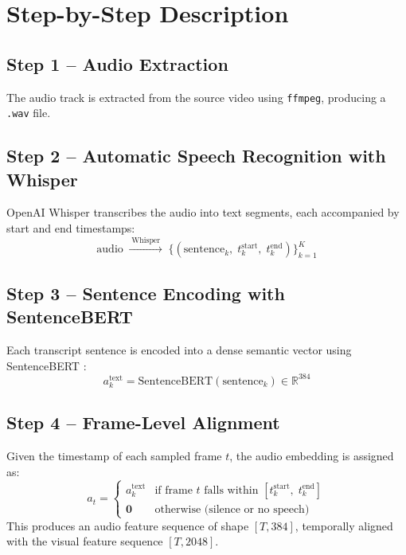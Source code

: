 \documentclass[12pt, a4paper]{report}
\begin{document}
\section{Step-by-Step Description}

\subsection{Step 1 -- Audio Extraction}
The audio track is extracted from the source video using \texttt{ffmpeg}, producing
a \texttt{.wav} file.

\subsection{Step 2 -- Automatic Speech Recognition with Whisper}
OpenAI Whisper \cite{radford2023} transcribes the audio into text segments, each
accompanied by start and end timestamps:
\[
  \text{audio} \;\xrightarrow{\;\text{Whisper}\;}\;
  \bigl\{(\text{sentence}_k,\; t^{\text{start}}_k,\; t^{\text{end}}_k)\bigr\}_{k=1}^{K}
\]

\subsection{Step 3 -- Sentence Encoding with SentenceBERT}
Each transcript sentence is encoded into a dense semantic vector using
SentenceBERT \cite{reimers2019}:
\begin{equation}
  a^{\text{text}}_k = \mathrm{SentenceBERT}(\text{sentence}_k) \in \mathbb{R}^{384}
\end{equation}

\subsection{Step 4 -- Frame-Level Alignment}
Given the timestamp of each sampled frame $t$, the audio embedding is assigned as:
\begin{equation}
  a_t =
  \begin{cases}
    a^{\text{text}}_k & \text{if frame } t \text{ falls within }
                          [t^{\text{start}}_k,\; t^{\text{end}}_k] \\[4pt]
    \mathbf{0}        & \text{otherwise (silence or no speech)}
  \end{cases}
\end{equation}
This produces an audio feature sequence of shape $[T, 384]$, temporally aligned
with the visual feature sequence $[T, 2048]$.
\end{document}
